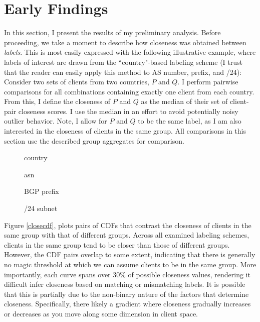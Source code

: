 \section{Early Findings} \label{skyfinds}

In this section, I present the results of my preliminary analysis. Before proceeding, we take a
moment to describe how closeness was obtained between \emph{labels}. This is most easily expressed
with the following illustrative example, where labels of interest are drawn from the
``country"-based labeling scheme (I trust that the reader can easily apply this method to AS
number, prefix, and /24): Consider two sets of clients from two countries, $P$ and $Q$. I perform
pairwise comparisons for all combinations containing exactly one client from each country.  From
this, I define the closeness of $P$ and $Q$ as the median of their set of client-pair closeness
scores. I use the median in an effort to avoid potentially noisy outlier behavior. Note, I allow
for $P$ and $Q$ to be the same label, as I am also interested in the closeness of clients in the
same group. All comparisons in this section use the described group aggregates for comparison. 

\begin{figure*}
    \center
            \begin{subfigure}[b]{.7\linewidth}
                \caption{country}
            \end{subfigure}
            \begin{subfigure}[b]{.7\linewidth}
                \caption{asn}
            \end{subfigure}
            \begin{subfigure}[b]{.7\linewidth}
                \caption{BGP prefix}
            \end{subfigure}
            \begin{subfigure}[b]{.7\linewidth}
                \caption{/24 subnet}
            \end{subfigure}
            \caption{CDFs of aggregate group closeness.}
            \label{closecdf}
\end{figure*}

Figure \ref{closecdf}, plots pairs of CDFs that contrast the closeness of clients in the same group with
that of different groups. Across all examined labeling schemes, clients in the same group tend to be
closer than those of different groups. However, the CDF pairs overlap to some extent, indicating
that there is generally no magic threshold at which we can assume clients to be in the same group.
More importantly, each curve spans over 30\% of possible closeness values, rendering it difficult
infer closeness based on matching or mismatching labels. It is possible that this is partially due
to the non-binary nature of the factors that determine closeness. Specifically, there likely a
gradient where closeness gradually increases or decreases as you move along some dimension in
client space. 

